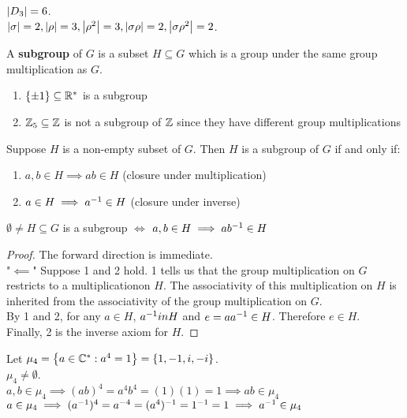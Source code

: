 \begin{example}
    $\left|D_3\right| = 6$. \\
    $\left|\sigma\right|=2, \left|\rho\right|=3, \left|\rho^2\right|=3, \left|\sigma\rho\right|=2, \left|\sigma\rho^2\right|=2$.
\end{example}

\begin{definition}[a subgroup]
    A \textbf{subgroup} of $G$ is a subset $H \subseteq G$ which is a group under the same group multiplication as $G$.
\end{definition}

\newpage %
\begin{example}[subgroups]
    \spacebeforelist
    \begin{enumerate}
        \item $\left\{\pm 1\right\} \subseteq \mathbb{R}^*$ is a subgroup
        \item $\mathbb{Z}_5 \subseteq \mathbb{Z}$ is not a subgroup of $\mathbb{Z}$ since they have different group multiplications
    \end{enumerate}
\end{example}

\begin{theorem}
    Suppose $H$ is a non-empty subset of $G$. Then $H$ is a subgroup of $G$ if and only if:
    \begin{enumerate}
        \item $a, b \in H \implies ab \in H$ (closure under multiplication)
        \item $a \in H \implies a^{-1} \in H$ (closure under inverse)
    \end{enumerate}
\end{theorem}

\begin{theorem}
    $\emptyset \neq H \subseteq G$ is a subgroup $\iff$ $a,b \in H \implies ab^{-1} \in H$
\end{theorem}

\begin{proof}
    The forward direction is immediate. \\
    "$\impliedby$" Suppose 1 and 2 hold. 1 tells us that the group multiplication on $G$ restricts to a multiplicationon $H$. The associativity of this multiplication on $H$ is inherited from the associativity of the group multiplication on $G$. \\
    By 1 and 2, for any $a \in H$, $a^{-1} in H$ and $e = a a^{-1} \in H$. Therefore $e \in H$. \\
    Finally, 2 is the inverse axiom for $H$.
\end{proof}

\begin{example}
    Let $\mu_4 = \left\{a \in \mathbb{C}^*: a^4 = 1\right\} = \left\{1, -1, i, -i\right\}$. \\
    $\mu_4 \neq \emptyset$. \\
    $a,b \in \mu_4 \implies (ab)^4 = a^4 b^4 = (1)(1) = 1 \implies ab \in \mu_4$ \\
    $a \in \mu_4 \implies (a^{-1})^4 = a^{-4} = (a^4)^{-1} = 1^{-1} = 1 \implies a^{-1} \in \mu_4$
\end{example}